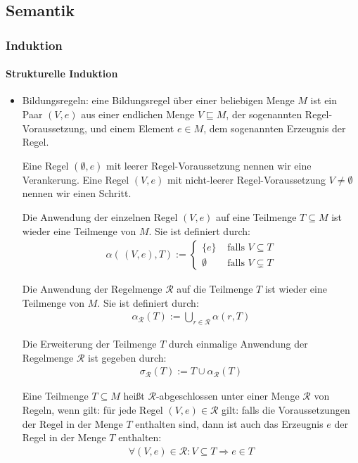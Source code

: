 \documentclass[
  a4paper,
  11pt,
]{scrartcl}
\newcommand{\Rc}{\mathcal{R}}
\begin{document}
\subsection{Semantik}
\label{sub:themen_inhalte_semantik}

\subsubsection{Induktion}
\label{ssub:Induktion}

\paragraph{Strukturelle Induktion}
\label{par:strukturelle_induktion}

\begin{itemize}
  \item Bildungsregeln: eine Bildungsregel über einer beliebigen Menge $M$ ist
    ein Paar $(V, e)$ aus einer endlichen Menge $V \sqsubseteq M$, der
    sogenannten Regel-Voraussetzung, und einem Element $e \in M$, dem
    sogenannten Erzeugnis der Regel.

    Eine Regel $(\emptyset, e)$ mit leerer Regel-Voraussetzung nennen wir eine
    Verankerung. Eine Regel $(V, e)$ mit nicht-leerer Regel-Voraussetzung $V
    \neq \emptyset$ nennen wir einen Schritt.

    Die Anwendung der einzelnen Regel $(V, e)$ auf eine Teilmenge $T \subseteq
    M$ ist wieder eine Teilmenge von $M$. Sie ist definiert durch:
    \begin{align*}
      \alpha( \, (V, e), T) :=
      \begin{cases}
        \{ e \} & \text{ falls } V \subseteq T\\
        \emptyset & \text{ falls } V \subsetneq T
      \end{cases}
    \end{align*}

    Die Anwendung der Regelmenge $\Rc$ auf die Teilmenge $T$ ist wieder eine
    Teilmenge von $M$. Sie ist definiert durch:
    \begin{align*}
      \alpha_{\Rc}(T) := \bigcup\limits_{r \in \Rc} \alpha(r, T)
    \end{align*}

    Die Erweiterung der Teilmenge $T$ durch einmalige Anwendung der Regelmenge
    $\Rc$ ist gegeben durch:
    \begin{align*}
      \sigma_{\Rc}(T) := T \cup \alpha_{\Rc}(T)
    \end{align*}

    Eine Teilmenge $T \subseteq M$ heißt $\Rc$-abgeschlossen unter einer Menge
    $\Rc$ von Regeln, wenn gilt: für jede Regel $(V, e) \in \Rc$ gilt: falls die
    Voraussetzungen der Regel in der Menge $T$ enthalten sind, dann ist auch das
    Erzeugnis $e$ der Regel in der Menge $T$ enthalten:
    \begin{align*}
      \forall (V, e) \in \Rc: V \subseteq T \Rightarrow e \in T
    \end{align*}
\end{itemize}
\end{document}
